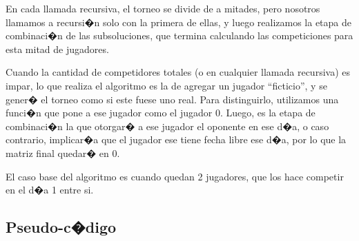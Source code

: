 \documentclass[11pt, a4paper, spanish]{article}
\begin{document}
	En cada llamada recursiva, el torneo se divide de a mitades, pero nosotros llamamos a recursi�n solo con la primera de ellas, y luego realizamos la etapa de combinaci�n de las subsoluciones, que termina calculando las competiciones para esta mitad de jugadores.
	
	Cuando la cantidad de competidores totales (o en cualquier llamada recursiva) es impar, lo que realiza el algoritmo es la de agregar un jugador "`ficticio"', y se gener� el torneo como si este fuese uno real. Para distinguirlo, utilizamos una funci�n que pone a ese jugador como el jugador 0. Luego, es la etapa de combinaci�n la que otorgar� a ese jugador el oponente en ese d�a, o caso contrario, implicar�a que el jugador ese tiene fecha libre ese d�a, por lo que la matriz final quedar� en 0.
	
	El caso base del algoritmo es cuando quedan 2 jugadores, que los hace competir en el d�a 1 entre si. 
	
	\subsection{Pseudo-c�digo}
	
\end{document}
